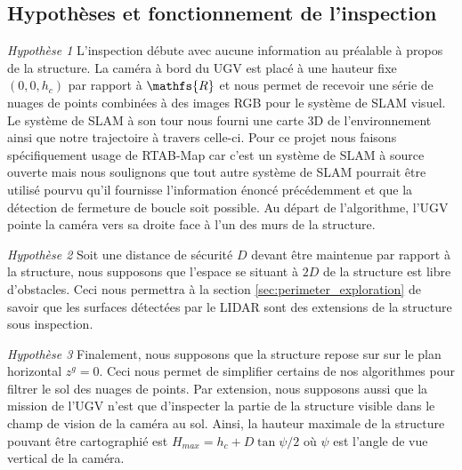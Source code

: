 
\subsection{Hypothèses et fonctionnement de l'inspection}
\label{sec:ugv_hypothesis}

\textit{Hypothèse 1} L'inspection débute avec aucune information au préalable à propos de la structure. La caméra à bord du UGV est placé à une hauteur fixe $(0,0,h_c)$ par rapport à $\mathfs{R}$ et nous permet de recevoir une série de nuages de points combinées à des images RGB pour le système de SLAM visuel. Le système de SLAM à son tour nous fourni une carte 3D de l'environnement ainsi que notre trajectoire à travers celle-ci. Pour ce projet nous faisons spécifiquement usage de RTAB-Map \citep{Labbe2014} car c'est un système de SLAM à source ouverte mais nous soulignons que tout autre système de SLAM pourrait être utilisé pourvu qu'il fournisse l'information énoncé précédemment et que la détection de fermeture de boucle soit possible. Au départ de l'algorithme, l'UGV pointe la caméra vers sa droite face à l'un des murs de la structure.

\textit{Hypothèse 2} Soit une distance de sécurité $D$ devant être maintenue par rapport à la structure, nous supposons que l'espace se situant à $2D$ de la structure est libre d'obstacles. Ceci nous permettra à la section \ref{sec:perimeter_exploration} de savoir que les surfaces détectées par le LIDAR sont des extensions de la structure sous inspection.

\textit{Hypothèse 3} Finalement, nous supposons que la structure repose sur sur le plan horizontal $z^g = 0$. Ceci nous permet de simplifier certains de nos algorithmes pour filtrer le sol des nuages de points. Par extension, nous supposons aussi que la mission de l'UGV n'est que d'inspecter la partie de la structure visible dans le champ de vision de la caméra au sol. Ainsi, la hauteur maximale de la structure pouvant être cartographié est $H_{max} = h_c + D \tan{\psi/2}$ où $\psi$ est l'angle de vue vertical de la caméra.

